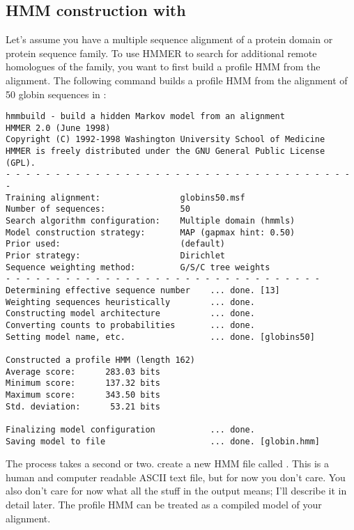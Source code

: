 \subsection{HMM construction with }

Let's assume you have a multiple sequence alignment of a protein
domain or protein sequence family. To use HMMER to search for
additional remote homologues of the family, you want to first build a
profile HMM from the alignment. The following command builds a profile
HMM from the alignment of 50 globin sequences in :

\vspace{1.5em}
\vspace{-1.5em}
{\small\begin{verbatim}
hmmbuild - build a hidden Markov model from an alignment
HMMER 2.0 (June 1998)
Copyright (C) 1992-1998 Washington University School of Medicine
HMMER is freely distributed under the GNU General Public License (GPL).
- - - - - - - - - - - - - - - - - - - - - - - - - - - - - - - - - - - -
Training alignment:                globins50.msf
Number of sequences:               50
Search algorithm configuration:    Multiple domain (hmmls)
Model construction strategy:       MAP (gapmax hint: 0.50)
Prior used:                        (default)
Prior strategy:                    Dirichlet
Sequence weighting method:         G/S/C tree weights
- - - - - - - - - - - - - - - - - - - - - - - - - - - - - - - -
Determining effective sequence number    ... done. [13]
Weighting sequences heuristically        ... done.
Constructing model architecture          ... done.
Converting counts to probabilities       ... done.
Setting model name, etc.                 ... done. [globins50]

Constructed a profile HMM (length 162)
Average score:      283.03 bits
Minimum score:      137.32 bits
Maximum score:      343.50 bits
Std. deviation:      53.21 bits

Finalizing model configuration           ... done.
Saving model to file                     ... done. [globin.hmm]
\end{verbatim}}

The process takes a second or two.   create a new HMM
file called . This is a human and computer readable
ASCII text file, but for now you don't care. You also don't care for
now what all the stuff in the output means; I'll describe it in detail
later. The profile HMM can be treated as a compiled model of your
alignment.

